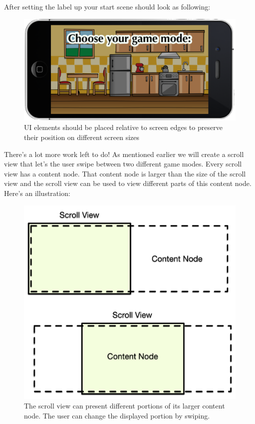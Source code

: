 After setting the label up your start scene should look as following:

\begin{figure}[H]
		\centering
		\includegraphics[width=0.7\linewidth]{images/Chapter7/start_scene.png}
		\caption{UI elements should be placed relative to screen edges to preserve
		their position on different screen sizes}
\end{figure}

There's a lot more work left to do! As mentioned earlier we will create a scroll
view that let's the user swipe between two different game modes. Every scroll
view has a content node. That content node is larger than the size of the scroll
view and the scroll view can be used to view different parts of this content
node. Here's an illustration:

\begin{figure}[H]
		\centering
		\includegraphics[width=0.5\linewidth]{images/Chapter7/scrollview_concept.png}
		\caption{The scroll view can present different portions of its larger content
		node. The user can change the displayed portion by swiping.}
\end{figure}


